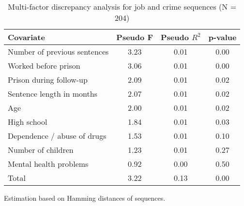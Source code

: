 \begin{table}[htp]
\footnotesize
\setlength{\tabcolsep}{10pt}
\renewcommand{\arraystretch}{1.3}
\begin{threeparttable}
\centering
\caption{Multi-factor discrepancy analysis for job and crime sequences (N = 204)} 
\label{tab:discrepancy_crime_job}
\begin{tabular}{lccc}
  \hline
Covariate & Pseudo F & Pseudo $R^2$ & p-value \\ 
  \hline
Number of previous sentences & 3.23 & 0.01 & 0.00 \\ 
  Worked before prison & 3.06 & 0.01 & 0.00 \\ 
  Prison during follow-up & 2.09 & 0.01 & 0.02 \\ 
  Sentence length in months & 2.07 & 0.01 & 0.02 \\ 
  Age & 2.00 & 0.01 & 0.02 \\ 
  High school & 1.84 & 0.01 & 0.03 \\ 
  Dependence / abuse of drugs & 1.53 & 0.01 & 0.10 \\ 
  Number of children & 1.23 & 0.01 & 0.27 \\ 
  Mental health problems & 0.92 & 0.00 & 0.50 \\ 
  Total & 3.22 & 0.13 & 0.00 \\ 
   \hline
\end{tabular}
\begin{tablenotes}
\scriptsize
\item Estimation based on Hamming distances of sequences.
\end{tablenotes}
\end{threeparttable}
\end{table}
